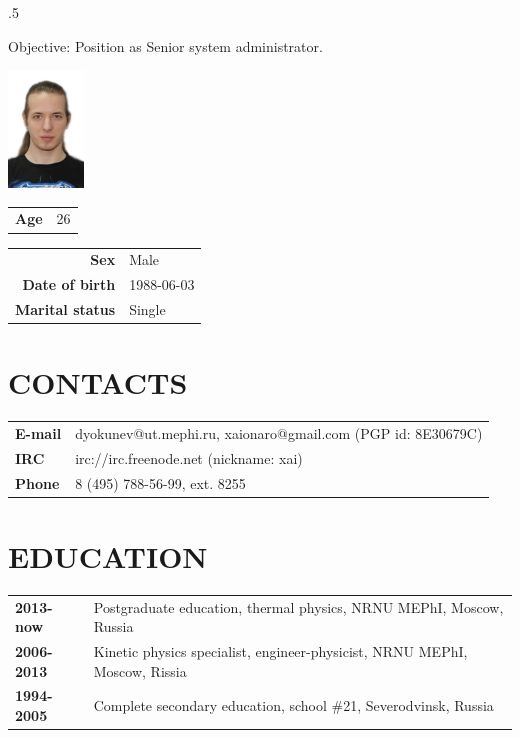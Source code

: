 \address{115522, 2 Moskvorechie Street (building 1), Moscow, Russia}


\begin{resume}
\vspace{0.1in}
\moveleft.5\sectionwidth\centerline{Objective: Position as Senior system administrator.}  

\vspace{-6.5em}
\flushright
\includegraphics[width=20mm]{photo.jpg}\\
\begin{tabular}{ll}
 {\bf Age} & 26\\
\end{tabular}
\flushleft

\vspace{-5.5em}
\begin{tabular}{rl}
 {\bf Sex}            & Male\\
 {\bf Date of birth}  & 1988-06-03\\
 {\bf Marital status} & Single\\
\end{tabular}

\section{CONTACTS}
\vspace{0.1in} 
\begin{tabular}{ll}
 {\bf E-mail} & dyokunev@ut.mephi.ru, xaionaro@gmail.com (PGP id: 8E30679C)\\
 {\bf IRC}    & irc://irc.freenode.net (nickname: xai)\\
 {\bf Phone}  & 8 (495) 788-56-99, ext. 8255\\
\end{tabular}

\section{EDUCATION}
\vspace{0.1in} 
\begin{tabular}{ll}
 {\bf 2013-now } & Postgraduate education, thermal physics, NRNU MEPhI, Moscow, Russia\\
 {\bf 2006-2013} & Kinetic physics specialist, engineer-physicist, NRNU MEPhI, Moscow, Rissia\\
 {\bf 1994-2005} & Complete secondary education, school \#21, Severodvinsk, Russia\\
\end{tabular}


\end{resume}
